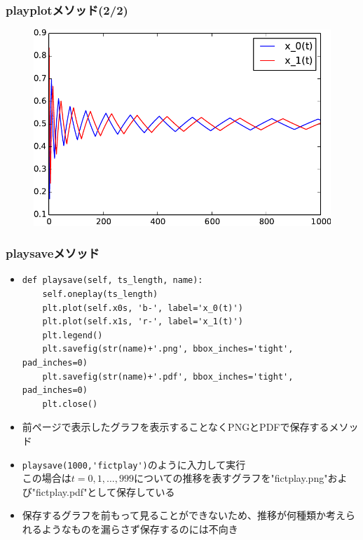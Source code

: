 \documentclass[dvipdfmx,fleqn]{beamer}
\begin{document}
\begin{frame}
\frametitle{playplotメソッド(2/2)}
\begin{figure}
 \centering
 \includegraphics[width=\linewidth]{oneplay2.pdf}
 \label{fig:matchingpennies_plot}
\end{figure}
\end{frame}

\begin{frame}[fragile]%
\frametitle{playsaveメソッド}
\begin{itemize}\setlength{\parskip}{0.5em}
\item
\scriptsize
\begin{verbatim} 
def playsave(self, ts_length, name):
    self.oneplay(ts_length)
    plt.plot(self.x0s, 'b-', label='x_0(t)')
    plt.plot(self.x1s, 'r-', label='x_1(t)')
    plt.legend()
    plt.savefig(str(name)+'.png', bbox_inches='tight', pad_inches=0)
    plt.savefig(str(name)+'.pdf', bbox_inches='tight', pad_inches=0)
    plt.close()
\end{verbatim}
\normalsize
\pause
\item
前ページで表示したグラフを表示することなくPNGとPDFで保存するメソッド\pause
\item
\verb|playsave(1000,'fictplay')|のように入力して実行\pause\\
この場合は$t=0,1,\dots,999$についての推移を表すグラフを"fictplay.png"および"fictplay.pdf"として保存している\pause
\item
保存するグラフを前もって見ることができないため、推移が何種類か考えられるようなものを漏らさず保存するのには不向き\pause\\
\end{itemize}
\end{frame}
\end{document}

